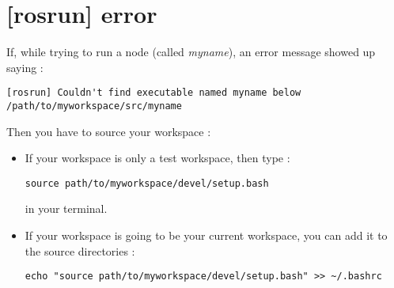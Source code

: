 \section{[rosrun] error}
\label{sec:rosrun error}
If, while trying to run a \faust node (called \textit{myname}), an error message showed up saying :

\begin{lstlisting}
[rosrun] Couldn't find executable named myname below /path/to/myworkspace/src/myname
\end{lstlisting}

Then you have to source your workspace :
\begin{itemize}[leftmargin=*]
	\item If your workspace is only a test workspace, then type :
	\begin{lstlisting}
source path/to/myworkspace/devel/setup.bash
	\end{lstlisting}
	in your terminal.
	\item If your workspace is going to be your current \ros workspace, you can add it to the source directories :
	\begin{lstlisting}
echo "source path/to/myworkspace/devel/setup.bash" >> ~/.bashrc 
	\end{lstlisting}
\end{itemize}
